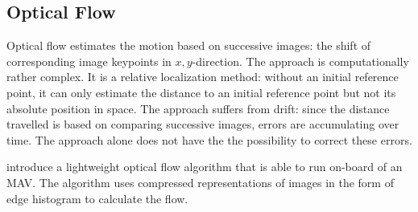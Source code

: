 
\subsection{Optical Flow}
\label{sec:opticalflow}

Optical flow estimates the motion based on successive images: the shift of corresponding image keypoints in $x,y$-direction.
The approach is computationally rather complex. It is a relative localization method: without an initial reference point, it can only estimate the distance to an initial reference point but not its absolute position in space. The approach suffers from drift: since the distance travelled is based on comparing successive images, errors are accumulating over time. The approach alone does not have the  the possibility to correct these errors.

\citet{mcguire2016local} introduce a lightweight optical flow algorithm that is able to run on-board of an MAV. The algorithm uses compressed representations of images in the form of edge histogram to calculate the flow.   